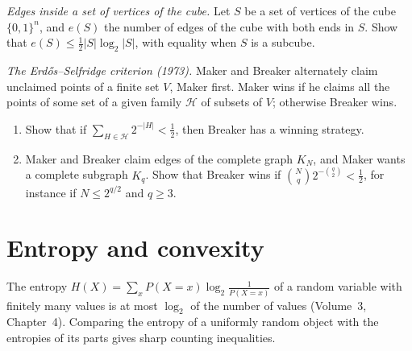 \begin{exercise}[$\star\star$]\label{pb:cubeiso}
\emph{Edges inside a set of vertices of the cube.} Let $S$ be a set of vertices of the cube $\{0,1\}^n$, and $e(S)$ the number of edges of
the cube with both ends in $S$. Show that $e(S)\le\frac12|S|\log_2|S|$, with equality when $S$ is a subcube.
\end{exercise}

\begin{exercise}[$\star\star$]\label{pb:erdosselfridge}
\emph{The Erdős--Selfridge criterion (1973).} Maker and Breaker alternately claim unclaimed points of a finite set $V$, Maker first.
Maker wins if he claims all the points of some set of a given family $\mathcal H$ of subsets of $V$; otherwise Breaker wins.
\begin{enumerate}[label=(\alph*)]
\item Show that if $\sum_{H\in\mathcal H}2^{-|H|}<\frac12$, then Breaker has a winning strategy.
\item Maker and Breaker claim edges of the complete graph $K_N$, and Maker wants a complete subgraph $K_q$. Show that Breaker wins if
$\binom Nq2^{-\binom q2}<\frac12$, for instance if $N\le2^{q/2}$ and $q\ge3$.
\end{enumerate}
\end{exercise}

\section{Entropy and convexity}

The entropy $H(X)=\sum_xP(X=x)\log_2\frac1{P(X=x)}$ of a random variable with finitely many values is at most $\log_2$ of the number of
values (Volume~3, Chapter~4). Comparing the entropy of a uniformly random object with the entropies of its parts gives sharp
counting inequalities.

